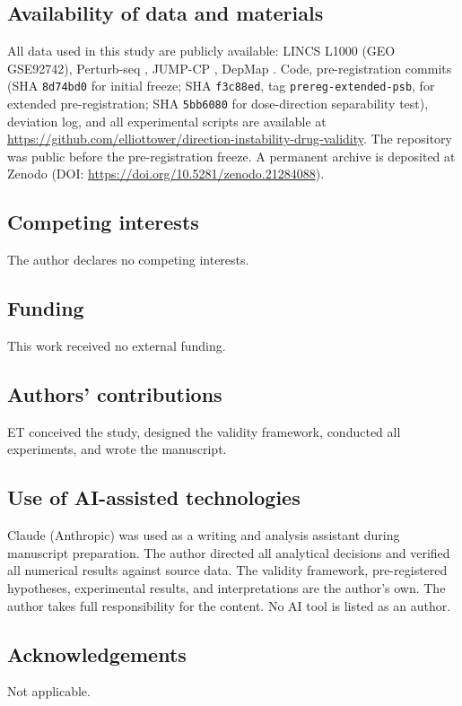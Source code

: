 \documentclass[11pt]{article}
\begin{document}
\subsection*{Availability of data and materials}
All data used in this study are publicly available: LINCS L1000
(GEO GSE92742), Perturb-seq \citep{replogle2022mapping}, JUMP-CP
\citep{chandrasekaran2023jump}, DepMap \citep{dempster2021chronos}.
Code, pre-registration commits (SHA \texttt{8d74bd0} for initial
freeze; SHA \texttt{f3c88ed}, tag \texttt{prereg-extended-psb}, for
extended pre-registration; SHA \texttt{5bb6080} for dose-direction
separability test), deviation log, and all experimental scripts are
available at
\url{https://github.com/elliottower/direction-instability-drug-validity}.
The repository was public before the pre-registration freeze.
A permanent archive is deposited at Zenodo
(DOI: \url{https://doi.org/10.5281/zenodo.21284088}).

\subsection*{Competing interests}
The author declares no competing interests.

\subsection*{Funding}
This work received no external funding.

\subsection*{Authors' contributions}
ET conceived the study, designed the validity framework, conducted
all experiments, and wrote the manuscript.

\subsection*{Use of AI-assisted technologies}
Claude (Anthropic) was used as a writing and analysis assistant during
manuscript preparation. The author directed all analytical decisions and
verified all numerical results against source data. The validity framework,
pre-registered hypotheses, experimental results, and interpretations are
the author's own. The author takes full responsibility for the content.
No AI tool is listed as an author.

\subsection*{Acknowledgements}
Not applicable.
\end{document}
